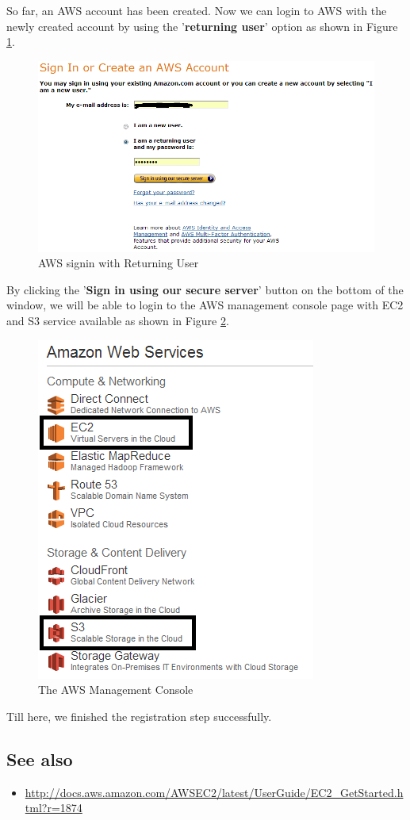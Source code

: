 So far, an AWS account has been created. Now we can login to AWS with the newly created account by using the '\textbf{returning user}' option as shown in Figure \ref{fig:aws.signin.return}.
\begin{figure}[ht]
  \centering
  \includegraphics[width=.8\textwidth]{figs/5163os_08_04.png}
  \caption{AWS signin with Returning User}\label{fig:aws.signin.return}
\end{figure} 
By clicking the '\textbf{Sign in using our secure server}' button on the bottom of the window, we will be able to login to the AWS management console page with EC2 and S3 service available as shown in Figure \ref{fig:aws.management.console}.
\begin{figure}[ht]
  \centering
  \includegraphics[width=.5\textwidth]{figs/5163os_08_05.png}
  \caption{The AWS Management Console}\label{fig:aws.management.console}
\end{figure} 
Till here, we finished the registration step successfully.
\subsection*{See also}
\begin{itemize}
  \item \url{http://docs.aws.amazon.com/AWSEC2/latest/UserGuide/EC2_GetStarted.html?r=1874}
\end{itemize}

